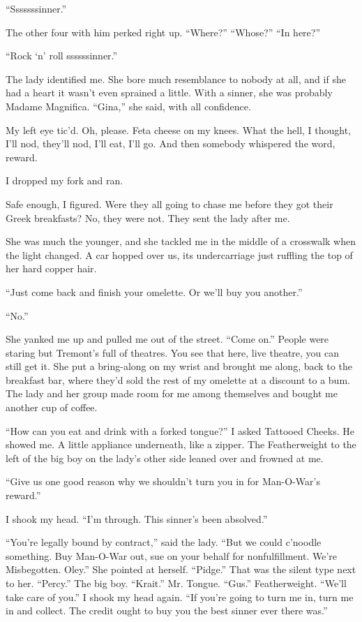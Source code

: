 “Sssssssinner.”

The other four with him perked right up. “Where?” “Whose?” “In here?”

“Rock ‘n' roll ssssssinner.”

The lady identified me. She bore much resemblance to nobody at all, and if she had a heart it wasn't even sprained a little. With a sinner, she was probably Madame Magnifica. “Gina,” she said, with all confidence.

My left eye tic'd. Oh, please. Feta cheese on my knees. What the hell, I thought, I'll nod, they'll nod, I'll eat, I'll go. And then somebody whispered the word, reward.

I dropped my fork and ran.

Safe enough, I figured. Were they all going to chase me before they got their Greek breakfasts? No, they were not. They sent the lady after me.

She was much the younger, and she tackled me in the middle of a crosswalk when the light changed. A car hopped over us, its undercarriage just ruffling the top of her hard copper hair.

“Just come back and finish your omelette. Or we'll buy you another.”

“No.”

She yanked me up and pulled me out of the street. “Come on.” People were staring but Tremont's full of theatres. You see that here, live theatre, you can still get it. She put a bring-along on my wrist and brought me along, back to the breakfast bar, where they'd sold the rest of my omelette at a discount to a bum. The lady and her group made room for me among themselves and bought me another cup of coffee.

“How can you eat and drink with a forked tongue?” I asked Tattooed Cheeks. He showed me. A little appliance underneath, like a zipper. The Featherweight to the left of the big boy on the lady's other side leaned over and frowned at me.

“Give us one good reason why we shouldn't turn you in for Man-O-War's reward.”

I shook my head. “I'm through. This sinner's been absolved.”

“You're legally bound by contract,” said the lady. “But we could c'noodle something. Buy Man-O-War out, sue on your behalf for nonfulfillment. We're Misbegotten. Oley.” She pointed at herself. “Pidge.” That was the silent type next to her. “Percy.” The big boy. “Krait.” Mr. Tongue. “Gus.” Featherweight. “We'll take care of you.”
I shook my head again. “If you're going to turn me in, turn me in and collect. The credit ought to buy you the best sinner ever there was.”

